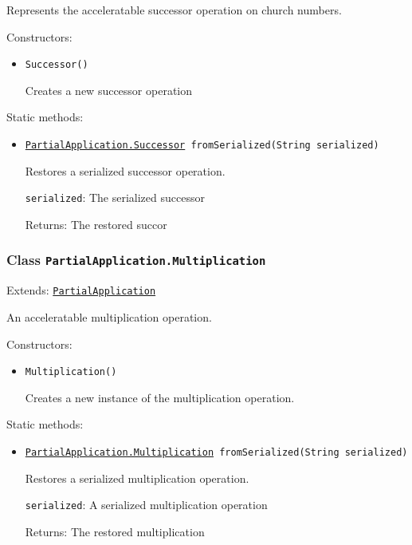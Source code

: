 Represents the acceleratable successor operation on church numbers.

Constructors:
\begin{itemize}
\item \texttt{Successor()}

Creates a new successor operation

\end{itemize}

Static methods:
\begin{itemize}
\item \texttt{\hyperref[type:edu.kit.wavelength.client.model.term.PartialApplication.Successor]{PartialApplication.Successor} fromSerialized(String serialized)}

Restores a serialized successor operation.

\texttt{serialized}: The serialized successor

Returns: The restored succor

\end{itemize}

\subsubsection{Class \texttt{PartialApplication.Multiplication}}
\label{type:edu.kit.wavelength.client.model.term.PartialApplication.Multiplication}
Extends: \texttt{\hyperref[type:edu.kit.wavelength.client.model.term.PartialApplication]{PartialApplication}}

An acceleratable multiplication operation.

Constructors:
\begin{itemize}
\item \texttt{Multiplication()}

Creates a new instance of the multiplication operation.

\end{itemize}

Static methods:
\begin{itemize}
\item \texttt{\hyperref[type:edu.kit.wavelength.client.model.term.PartialApplication.Multiplication]{PartialApplication.Multiplication} fromSerialized(String serialized)}

Restores a serialized multiplication operation.

\texttt{serialized}: A serialized multiplication operation

Returns: The restored multiplication

\end{itemize}

